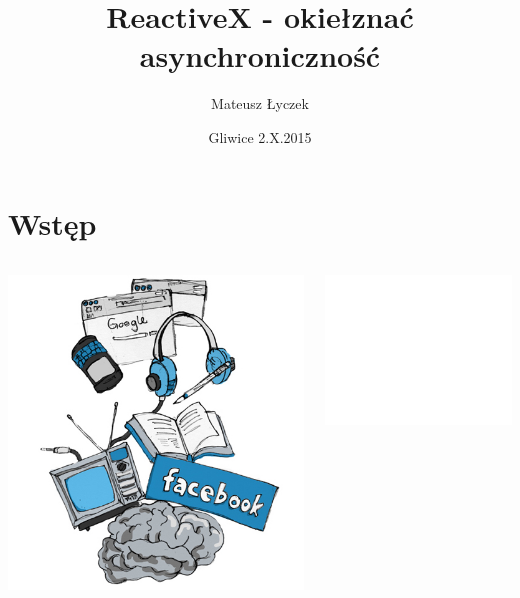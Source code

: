 \documentclass[24pt]{beamer}
\title[ReactiveX]{ReactiveX - okiełznać asynchroniczność}
\date{Gliwice 2.X.2015}
\author{Mateusz Łyczek}
\begin{document}
\begin{frame}[plain]
    \titlepage
\end{frame}

\section{Wstęp}

\begin{frame}
    \begin{columns}
        \begin{column}{.5\textwidth}
            \begin{center}
                \includegraphics[height=.6\textheight]{images/multitasking.jpg}
            \end{center}
        \end{column}
        \begin{column}{.5\textwidth}
            \begin{center}
                \includegraphics<2>[width=.6\textwidth]{images/chip.pdf}
            \end{center}
        \end{column}
    \end{columns}
\end{frame}
\end{document}
